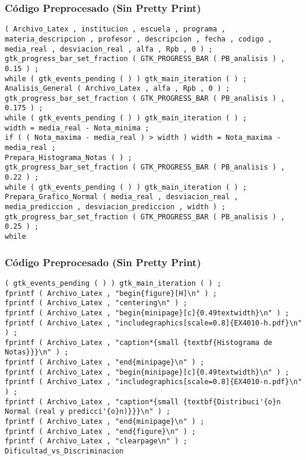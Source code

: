 \documentclass{beamer}
\begin{document}
\begin{frame}[fragile]
\frametitle{C\'odigo Preprocesado (Sin Pretty Print)}
\begin{lstlisting}[style=CStyle]
( Archivo_Latex , institucion , escuela , programa , materia_descripcion , profesor , descripcion , fecha , codigo , media_real , desviacion_real , alfa , Rpb , 0 ) ; 
gtk_progress_bar_set_fraction ( GTK_PROGRESS_BAR ( PB_analisis ) , 0.15 ) ; 
while ( gtk_events_pending ( ) ) gtk_main_iteration ( ) ; 
Analisis_General ( Archivo_Latex , alfa , Rpb , 0 ) ; 
gtk_progress_bar_set_fraction ( GTK_PROGRESS_BAR ( PB_analisis ) , 0.175 ) ; 
while ( gtk_events_pending ( ) ) gtk_main_iteration ( ) ; 
width = media_real - Nota_minima ; 
if ( ( Nota_maxima - media_real ) > width ) width = Nota_maxima - media_real ; 
Prepara_Histograma_Notas ( ) ; 
gtk_progress_bar_set_fraction ( GTK_PROGRESS_BAR ( PB_analisis ) , 0.22 ) ; 
while ( gtk_events_pending ( ) ) gtk_main_iteration ( ) ; 
Prepara_Grafico_Normal ( media_real , desviacion_real , media_prediccion , desviacion_prediccion , width ) ; 
gtk_progress_bar_set_fraction ( GTK_PROGRESS_BAR ( PB_analisis ) , 0.25 ) ; 
while \end{lstlisting}
\end{frame}
\begin{frame}[fragile]
\frametitle{C\'odigo Preprocesado (Sin Pretty Print)}
\begin{lstlisting}[style=CStyle]
( gtk_events_pending ( ) ) gtk_main_iteration ( ) ; 
fprintf ( Archivo_Latex , "begin{figure}[H]\n" ) ; 
fprintf ( Archivo_Latex , "centering\n" ) ; 
fprintf ( Archivo_Latex , "begin{minipage}[c]{0.49textwidth}\n" ) ; 
fprintf ( Archivo_Latex , "includegraphics[scale=0.8]{EX4010-h.pdf}\n" ) ; 
fprintf ( Archivo_Latex , "caption*{small {textbf{Histograma de Notas}}}\n" ) ; 
fprintf ( Archivo_Latex , "end{minipage}\n" ) ; 
fprintf ( Archivo_Latex , "begin{minipage}[c]{0.49textwidth}\n" ) ; 
fprintf ( Archivo_Latex , "includegraphics[scale=0.8]{EX4010-n.pdf}\n" ) ; 
fprintf ( Archivo_Latex , "caption*{small {textbf{Distribuci'{o}n Normal (real y predicci'{o}n)}}}\n" ) ; 
fprintf ( Archivo_Latex , "end{minipage}\n" ) ; 
fprintf ( Archivo_Latex , "end{figure}\n" ) ; 
fprintf ( Archivo_Latex , "clearpage\n" ) ; 
Dificultad_vs_Discriminacion \end{lstlisting}
\end{frame}
\end{document}

